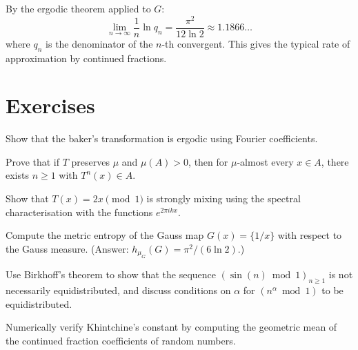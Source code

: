 \begin{example}
By the ergodic theorem applied to $G$:
\[
    \lim_{n \to \infty} \frac{1}{n}\ln q_n
    = \frac{\pi^2}{12\ln 2} \approx 1.1866\ldots
\]
where $q_n$ is the denominator of the $n$-th convergent. This gives the
typical rate of approximation by continued fractions.
\end{example}

\section{Exercises}

\begin{exercise}[Ergodicity]
Show that the baker's transformation is ergodic using Fourier coefficients.
\end{exercise}

\begin{exercise}
Prove that if $T$ preserves $\mu$ and $\mu(A) > 0$, then for $\mu$-almost
every $x \in A$, there exists $n \geq 1$ with $T^n(x) \in A$.
\end{exercise}

\begin{exercise}
Show that $T(x) = 2x \pmod{1}$ is strongly mixing using the spectral
characterisation with the functions $e^{2\pi ikx}$.
\end{exercise}

\begin{exercise}[Entropy]
Compute the metric entropy of the Gauss map $G(x) = \{1/x\}$ with respect
to the Gauss measure. (Answer: $h_{\mu_G}(G) = \pi^2/(6\ln 2)$.)
\end{exercise}

\begin{exercise}[Equidistribution]
Use Birkhoff's theorem to show that the sequence $(\sin(n) \bmod 1)_{n \geq 1}$
is not necessarily equidistributed, and discuss conditions on $\alpha$ for
$(n^\alpha \bmod 1)$ to be equidistributed.
\end{exercise}

\begin{exercise}
Numerically verify Khintchine's constant by computing the geometric mean of
the continued fraction coefficients of random numbers.
\end{exercise}
